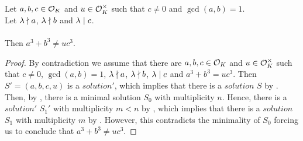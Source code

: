\begin{theorem}
    \label{thm:fermatLastTheoremForThreeGen}
    \leanok
    Let $a, b, c \in \mathcal{O}_K$ and $u \in \mathcal{O}^\times_K$ such that $c \neq 0$ and $\gcd(a,b)=1$.\\
    Let $\lambda \nmid a$, $\lambda \nmid b$ and $\lambda \mid c$. \\\\
    Then $a^3 + b^3 \neq u c^3$.
\end{theorem}
\begin{proof}
    \leanok
    By contradiction we assume that there are $a, b, c \in \mathcal{O}_K$ and $u \in \mathcal{O}^\times_K$
    such that $c \neq 0$, $\gcd(a,b)=1$, $\lambda \nmid a$, $\lambda \nmid b$,
    $\lambda \mid c$ and $a^3 + b^3 = u c^3$.
    Then $S'=(a,b,c,u)$ is a $solution'$, which implies that there is a $solution$ $S$ by
    .
    Then, by , there is a minimal solution $S_0$ with multiplicity $n$.
    Hence, there is a $solution'$ $S_1'$ with multiplicity $m<n$ by ,
    which implies that there is a $solution$ $S_1$  with multiplicity $m$ by .
    However, this contradicts the minimality of $S_0$
    forcing us to conclude that $a^3 + b^3 \neq u c^3$.
\end{proof}

